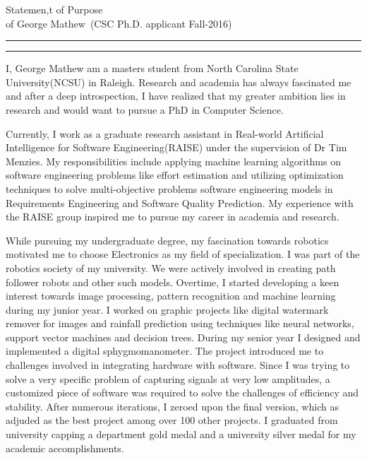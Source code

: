\documentclass{article}
\newcommand{\soptitle}{Statemen,t of Purpose}
\newcommand{\yourname}{George Mathew}
\begin{document}
\begin{center}\LARGE\soptitle\\
\large of \yourname\ (CSC Ph.D. applicant Fall-2016)
\end{center}

\hrule
\vspace{1pt}
\hrule height 1pt

\bigskip

I, George Mathew am a masters student from North Carolina State University(NCSU) in Raleigh. Research and academia has always fascinated me and after a deep introspection, I have realized that my greater ambition lies in research and would want to pursue a PhD in Computer Science.

\bigskip
Currently, I work as a graduate research assistant in Real-world Artificial Intelligence for 
Software Engineering(RAISE) under the supervision of Dr Tim Menzies.
 My responsibilities include applying machine learning algorithms on software engineering 
 problems like effort estimation and utilizing optimization techniques to solve multi-objective problems software engineering models in Requirements Engineering and Software Quality Prediction. My experience with the RAISE group inspired me to pursue my career in academia and research. 

\bigskip

While pursuing my undergraduate degree, my fascination towards robotics motivated me to choose Electronics as my field of specialization. I was part of the robotics society of my university. We were actively involved in creating path follower robots and other such models. Overtime, I started developing a keen interest towards image 
processing, pattern recognition and machine learning during my junior year. I worked on 
graphic projects like digital watermark remover for images and rainfall prediction using techniques like neural 
networks, support vector machines and decision trees. During my senior year I designed and implemented a digital sphygmomanometer. The project introduced me to challenges involved in integrating hardware with software. Since I was trying to solve a very specific problem of capturing signals at very low amplitudes, a customized piece of software was required to solve the challenges of efficiency and stability. After numerous iterations, I zeroed upon the final version, which as adjuded as the best project among over 100 other projects. I graduated from university capping a department gold medal and a university silver medal for my academic accomplishments.
\end{document}
